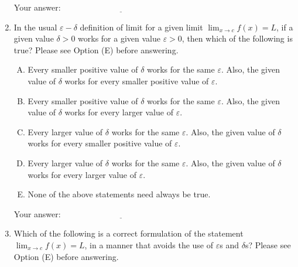 \documentclass[10pt]{amsart}
\begin{document}
\begin{enumerate}
  \vspace{0.1in}
  Your answer: $\underline{\qquad\qquad\qquad\qquad\qquad\qquad\qquad}$
  \vspace{0.5in}

\item In the usual $\varepsilon-\delta$ definition of limit for a given
  limit $\displaystyle \lim_{x \to c} f(x) = L$, if a given value $\delta > 0$ works
  for a given value $\varepsilon > 0$, then which of the following is
  true? Please see Option (E) before answering.

  \begin{enumerate}[(A)]
  \item Every smaller positive value of $\delta$ works for the same
    $\varepsilon$. Also, the given value of $\delta$ works for every
    smaller positive value of $\varepsilon$.
  \item Every smaller positive value of $\delta$ works for the same
    $\varepsilon$. Also, the given value of $\delta$ works for every
    larger value of $\varepsilon$.
  \item Every larger value of $\delta$ works for the same
    $\varepsilon$. Also, the given value of $\delta$ works for every
    smaller positive value of $\varepsilon$.
  \item Every larger value of $\delta$ works for the same
    $\varepsilon$. Also, the given value of $\delta$ works for every
    larger value of $\varepsilon$.
  \item None of the above statements need always be true.
  \end{enumerate}

  \vspace{0.1in}
  Your answer: $\underline{\qquad\qquad\qquad\qquad\qquad\qquad\qquad}$
  \vspace{0.5in}

\item Which of the following is a correct formulation of the statement
  $\displaystyle \lim_{x \to c} f(x) = L$, in a manner that avoids the use of
  $\varepsilon$s and $\delta$s? Please see Option (E) before answering.


\end{enumerate}
\end{document}
